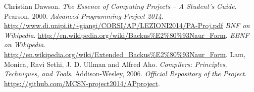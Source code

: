 \cleardoublepage  					%


\begin{thebibliography}{99}
 Christian Dawson. \emph{The Essence of Computing Projects -- A Student's Guide}. Pearson, 2000.
\emph{Advanced Programming Project 2014}. \href{http:\/\/www.di.unipi.it\/\~giangi\/CORSI\/AP\/LEZIONI2014\/PA-Proj.pdf}{\url{http://www.di.unipi.it/~giangi/CORSI/AP/LEZIONI2014/PA-Proj.pdf}}
\emph{BNF on Wikipedia}. \href{http:\/\/en.wikipedia.org\/wiki\/Backus\%E2\%80\%93Naur\_Form}{\url{http://en.wikipedia.org/wiki/Backus\%E2\%80\%93Naur\_Form}}.
\emph{EBNF on Wikipedia}. \href{http:\/ \/en.wikipedia.org\/wiki\/Extended\_Backus\%E2\%80\%93Naur\_Form}{\url{http://en.wikipedia.org/wiki/Extended\_Backus\%E2\%80\%93Naur\_Form}}.
Lam, Monica, Ravi Sethi, J. D. Ullman and Alfred Aho. \emph{Compilers: Principles, Techniques, and Tools}. Addison-Wesley, 2006.
\emph{Official Repository of the Project}. \href{https:\/\/github.com\/MCSN-project2014\/APproject}{\url{https://github.com/MCSN-project2014/APproject}}.

\end{thebibliography}
